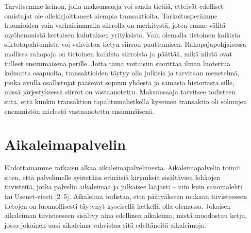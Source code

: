 \documentclass{article}
\begin{document}
Tarvitsemme keinon, jolla maksunsaaja voi saada tietää, etteivät e\-del\-li\-set  omistajat ole allekirjoittaneet aiempia transaktioita. Tarkoitusperämme huomioiden vain varhaisimmalla siirrolla on merkitystä, joten emme välitä myö\-hem\-mis\-tä kertaisen kulutuksen yrityksistä. Vain olemalla tietoinen kaikista siirtotapahtumista voi vahvistaa tietyn siirron puuttumisen. Rahapajapohjaisessa mallissa rahapaja on tietoinen kaikista siirroista ja päättää, mikä niistä ovat tulleet ensimmäisenä perille. Jotta tämä voitaisiin suorittaa ilman luotettua kolmatta osapuolta, transaktioiden täytyy olla julkisia \cite{1} ja tarvitaan menetelmä, jonka avulla osallistujat pääsevät sopuun yhdestä ja samasta historiasta sille, missä järjestyksessä siirrot on vastaanotettu. Maksunsaaja tarvitsee todisteen siitä, että kunkin transaktion tapahtumahetkellä kyseinen transaktio oli solmujen enemmistön mielestä vastaanotettu ensimmäisenä.

\section{Aikaleimapalvelin}

Ehdottamamme ratkaisu alkaa aikaleimapalvelimesta. Aikaleimapalvelin toimii siten, että palvelimelle syötetään erinäisiä kirjauksia sisältävien lohkojen tiivisteitä, jotka palvelin aikaleimaa ja julkaisee laajasti – niin kuin sanomalehti tai Usenet-viesti [2–5]. Aikaleima todistaa, että päätyäkseen mukaan tiivisteeseen tietojen on luonnollisesti täytynyt kyseisellä hetkellä olla olemassa. Jokaisen aikaleiman tiivisteeseen sisältyy aina edellinen aikaleima, mistä muodostuu ketju, jossa jokainen uusi aikaleima vahvistaa sitä edeltäneitä aikaleimoja.
\end{document}
